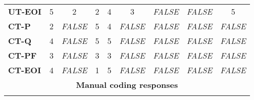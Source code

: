 \documentclass[final_report_innit.tex]{subfiles}
\begin{document}
\begin{center}
\begin{tabular}[b]{l | c | c | c | c | c | c | c | c}
	\textbf{UT-EOI} & 5 & 2 & 2 & 4 & 3 & \textit{FALSE} & \textit{FALSE} & 5 \\ %
	\textbf{CT-P} & 2 & \textit{FALSE} & 5 & 4 & \textit{FALSE} & \textit{FALSE} & \textit{FALSE} & \textit{FALSE} \\ %
	\textbf{CT-Q} & 4 & \textit{FALSE} & 5 & 5 & \textit{FALSE} & \textit{FALSE} & \textit{FALSE} & \textit{FALSE} \\ %
	\textbf{CT-PF} & 3 & \textit{FALSE} & 3 & 3 & \textit{FALSE} & \textit{FALSE} & \textit{FALSE} & \textit{FALSE} \\ %
	\textbf{CT-EOI} & 4 & \textit{FALSE} & 1 & 5 & \textit{FALSE} & \textit{FALSE} & \textit{FALSE} & \textit{FALSE} \\ %
	\multicolumn{9}{c}{\cellcolor{white} \textbf{Manual coding responses}} \\
	\multicolumn{9}{c}{\cellcolor{white}} \\
\end{tabular}


\end{center}
\end{document}
